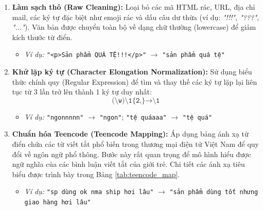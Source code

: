\documentclass[12pt,a4paper]{article}
\begin{document}
\begin{enumerate}
    \item \textbf{Làm sạch thô (Raw Cleaning):} 
    Loại bỏ các mã HTML rác, URL, địa chỉ mail, các ký tự đặc biệt như emoji rác và dấu câu dư thừa (ví dụ: \textit{"!!!", "???", "..."}). Văn bản được chuyển toàn bộ về dạng chữ thường (lowercase) để giảm kích thước từ điển.
    \begin{itemize}
        \item \textit{Ví dụ:} \texttt{"<p>Sản phẩm QUÁ TỆ!!!</p>"} $\rightarrow$ \texttt{"sản phẩm quá tệ"}
    \end{itemize}
    
    \item \textbf{Khử lặp ký tự (Character Elongation Normalization):}
    Sử dụng biểu thức chính quy (Regular Expression) để tìm và thay thế các ký tự lặp lại liên tục từ 3 lần trở lên thành 1 ký tự duy nhất:
    \begin{equation}
        \texttt{(\textbackslash w)\textbackslash 1\{2,\}} \rightarrow \texttt{\textbackslash 1}
    \end{equation}
    \begin{itemize}
        \item \textit{Ví dụ:} \texttt{"ngonnnnn"} $\rightarrow$ \texttt{"ngon"}; \texttt{"tệ quáaaa"} $\rightarrow$ \texttt{"tệ quá"}
    \end{itemize}
    
    \item \textbf{Chuẩn hóa Teencode (Teencode Mapping):}
    Áp dụng bảng ánh xạ từ điển chứa các từ viết tắt phổ biến trong thương mại điện tử Việt Nam để quy đổi về ngôn ngữ phổ thông. Bước này rất quan trọng để mô hình hiểu được ngữ nghĩa của các bình luận viết tắt của giới trẻ. Chi tiết các ánh xạ tiêu biểu được trình bày trong Bảng \ref{tab:teencode_map}.
    \begin{itemize}
        \item \textit{Ví dụ:} \texttt{"sp dùng ok nma ship hơi lâu"} $\rightarrow$ \texttt{"sản phẩm dùng tốt nhưng giao hàng hơi lâu"}
    \end{itemize}


\end{enumerate}
\end{document}
